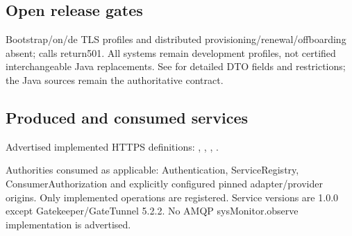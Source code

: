 \documentclass[a4paper]{arrowhead}
\begin{document}
\subsection{Open release gates}
Bootstrap/on/de TLS profiles and distributed provisioning/renewal/offboarding absent; calls return501. All systems remain development profiles, not certified interchangeable Java replacements. See  for detailed DTO fields and restrictions; the Java sources remain the authoritative contract.
\subsection{Produced and consumed services}
Advertised implemented HTTPS definitions: , \allowbreak {}, \allowbreak {}, \allowbreak {}.\par
Authorities consumed as applicable: Authentication, ServiceRegistry, ConsumerAuthorization and explicitly configured pinned adapter/provider origins. Only implemented operations are registered. Service versions are 1.0.0 except Gatekeeper/GateTunnel 5.2.2. No AMQP sysMonitor.observe implementation is advertised.
\end{document}
